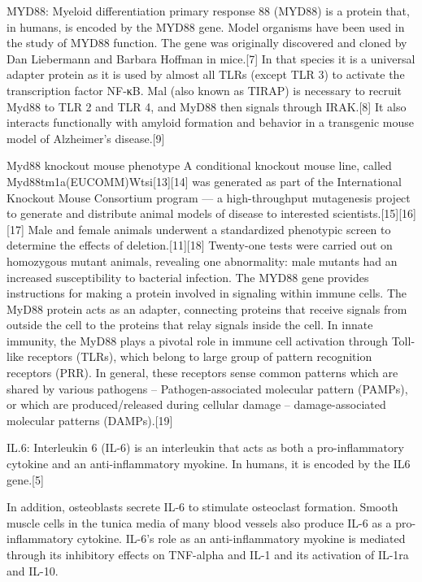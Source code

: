 \documentclass[
]{article}
\begin{document}
MYD88: Myeloid differentiation primary response 88 (MYD88) is a protein
that, in humans, is encoded by the MYD88 gene. Model organisms have been
used in the study of MYD88 function. The gene was originally discovered
and cloned by Dan Liebermann and Barbara Hoffman in mice.{[}7{]} In that
species it is a universal adapter protein as it is used by almost all
TLRs (except TLR 3) to activate the transcription factor NF-κB. Mal
(also known as TIRAP) is necessary to recruit Myd88 to TLR 2 and TLR 4,
and MyD88 then signals through IRAK.{[}8{]} It also interacts
functionally with amyloid formation and behavior in a transgenic mouse
model of Alzheimer's disease.{[}9{]}

Myd88 knockout mouse phenotype A conditional knockout mouse line, called
Myd88tm1a(EUCOMM)Wtsi{[}13{]}{[}14{]} was generated as part of the
International Knockout Mouse Consortium program --- a high-throughput
mutagenesis project to generate and distribute animal models of disease
to interested scientists.{[}15{]}{[}16{]}{[}17{]} Male and female
animals underwent a standardized phenotypic screen to determine the
effects of deletion.{[}11{]}{[}18{]} Twenty-one tests were carried out
on homozygous mutant animals, revealing one abnormality: male mutants
had an increased susceptibility to bacterial infection. The MYD88 gene
provides instructions for making a protein involved in signaling within
immune cells. The MyD88 protein acts as an adapter, connecting proteins
that receive signals from outside the cell to the proteins that relay
signals inside the cell. In innate immunity, the MyD88 plays a pivotal
role in immune cell activation through Toll-like receptors (TLRs), which
belong to large group of pattern recognition receptors (PRR). In
general, these receptors sense common patterns which are shared by
various pathogens -- Pathogen-associated molecular pattern (PAMPs), or
which are produced/released during cellular damage -- damage-associated
molecular patterns (DAMPs).{[}19{]}

IL.6: Interleukin 6 (IL-6) is an interleukin that acts as both a
pro-inflammatory cytokine and an anti-inflammatory myokine. In humans,
it is encoded by the IL6 gene.{[}5{]}

In addition, osteoblasts secrete IL-6 to stimulate osteoclast formation.
Smooth muscle cells in the tunica media of many blood vessels also
produce IL-6 as a pro-inflammatory cytokine. IL-6's role as an
anti-inflammatory myokine is mediated through its inhibitory effects on
TNF-alpha and IL-1 and its activation of IL-1ra and IL-10.
\end{document}
